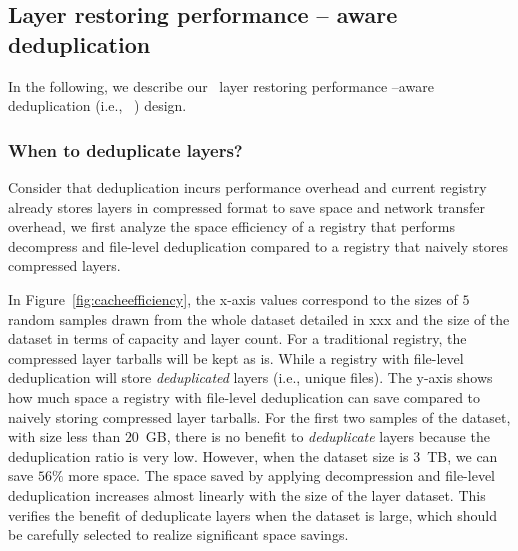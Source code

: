 \subsection{Layer restoring performance -- aware deduplication}
\label{sec:dedup-desgin}

%
In the following, we describe our \sysname~layer restoring performance --aware deduplication
 (i.e., \sysname~\dedupname) design. 


\subsubsection{When to deduplicate layers?}



Consider that deduplication incurs performance overhead and current registry already stores layers in compressed format to save space and network transfer overhead, 
 we first analyze the space efficiency of a registry that performs decompress and file-level deduplication compared to 
 a registry that naively stores compressed layers.

In Figure~\ref{fig:cacheefficiency}, the x-axis values correspond to the sizes of $5$ random samples drawn from the whole dataset detailed in xxx and the size of the dataset in terms of capacity and layer count.
For a traditional registry, the compressed layer tarballs will be kept as is.
While a registry with file-level deduplication will store \emph{deduplicated} layers (i.e., unique files). 
The y-axis shows how much space a registry with file-level deduplication can save compared to naively storing compressed layer tarballs.
For the first two samples of the dataset, with size less than $20$~GB, 
there is no benefit to \emph{deduplicate} layers 
because the deduplication ratio is very low.
However, when the dataset size is $3$~TB, we can save $56\%$ more space.
The space saved by applying decompression and file-level deduplication increases almost linearly with the size of the layer dataset.
This verifies the benefit of deduplicate layers when the dataset is large, which should be carefully selected to realize significant space savings.

